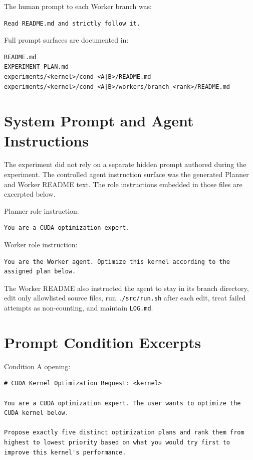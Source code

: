 \documentclass[conference]{IEEEtran}
\begin{document}
The human prompt to each Worker branch was:

\begin{lstlisting}
Read README.md and strictly follow it.
\end{lstlisting}

Full prompt surfaces are documented in:

\begin{lstlisting}
README.md
EXPERIMENT_PLAN.md
experiments/<kernel>/cond_<A|B>/README.md
experiments/<kernel>/cond_<A|B>/workers/branch_<rank>/README.md
\end{lstlisting}

\section{System Prompt and Agent Instructions}

The experiment did not rely on a separate hidden prompt authored during the
experiment. The controlled agent instruction surface was the generated Planner
and Worker README text. The role instructions embedded in those files are
excerpted below.

Planner role instruction:
\begin{lstlisting}
You are a CUDA optimization expert.
\end{lstlisting}

Worker role instruction:
\begin{lstlisting}
You are the Worker agent. Optimize this kernel according to the assigned plan below.
\end{lstlisting}

The Worker README also instructed the agent to stay in its branch directory,
edit only allowlisted source files, run \texttt{./src/run.sh} after each edit,
treat failed attempts as non-counting, and maintain \texttt{LOG.md}.

\section{Prompt Condition Excerpts}

Condition A opening:
\begin{lstlisting}
# CUDA Kernel Optimization Request: <kernel>

You are a CUDA optimization expert. The user wants to optimize the CUDA kernel below.

Propose exactly five distinct optimization plans and rank them from highest to lowest priority based on what you would try first to improve this kernel's performance.
\end{lstlisting}
\end{document}
